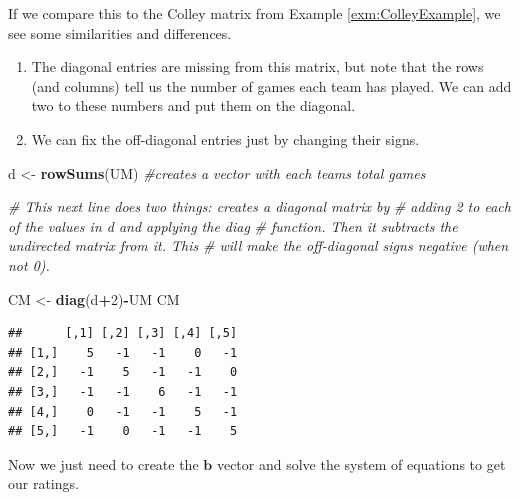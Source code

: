 \documentclass[
]{book}
\newenvironment{Shaded}{\begin{snugshade}}{\end{snugshade}}
\newcommand{\CommentTok}[1]{\textcolor[rgb]{0.56,0.35,0.01}{\textit{#1}}}
\newcommand{\DecValTok}[1]{\textcolor[rgb]{0.00,0.00,0.81}{#1}}
\newcommand{\FunctionTok}[1]{\textcolor[rgb]{0.13,0.29,0.53}{\textbf{#1}}}
\newcommand{\NormalTok}[1]{#1}
\newcommand{\OtherTok}[1]{\textcolor[rgb]{0.56,0.35,0.01}{#1}}
\newcommand{\SpecialCharTok}[1]{\textcolor[rgb]{0.81,0.36,0.00}{\textbf{#1}}}
\theoremstyle{definition}
\theoremstyle{definition}
\theoremstyle{definition}
\theoremstyle{definition}
\theoremstyle{remark}
\begin{document}
If we compare this to the Colley matrix from Example \ref{exm:ColleyExample}, we see some similarities and differences.

\begin{enumerate}
\def\labelenumi{\arabic{enumi}.}
\item
  The diagonal entries are missing from this matrix, but note that the rows (and columns) tell us the number of games each team has played. We can add two to these numbers and put them on the diagonal.
\item
  We can fix the off-diagonal entries just by changing their signs.
\end{enumerate}

\begin{Shaded}
\begin{Highlighting}[]
\NormalTok{d }\OtherTok{\textless{}{-}} \FunctionTok{rowSums}\NormalTok{(UM) }\CommentTok{\#creates a vector with each team\textquotesingle{}s total games}

\CommentTok{\# This next line does two things: creates a diagonal matrix by}
\CommentTok{\# adding 2 to each of the values in d and applying the diag}
\CommentTok{\# function. Then it subtracts the undirected matrix from it. This }
\CommentTok{\# will make the off{-}diagonal signs negative (when not 0).}

\NormalTok{CM }\OtherTok{\textless{}{-}} \FunctionTok{diag}\NormalTok{(d}\SpecialCharTok{+}\DecValTok{2}\NormalTok{)}\SpecialCharTok{{-}}\NormalTok{UM }
\NormalTok{CM}
\end{Highlighting}
\end{Shaded}

\begin{verbatim}
##      [,1] [,2] [,3] [,4] [,5]
## [1,]    5   -1   -1    0   -1
## [2,]   -1    5   -1   -1    0
## [3,]   -1   -1    6   -1   -1
## [4,]    0   -1   -1    5   -1
## [5,]   -1    0   -1   -1    5
\end{verbatim}

Now we just need to create the \(\mathbf{b}\) vector and solve the system of equations to get our ratings.
\end{document}
